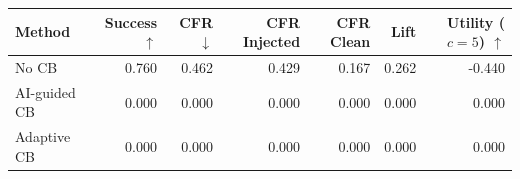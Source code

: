 \begin{tabular}{lrrrrrr}
\toprule
Method & Success $\uparrow$ & CFR $\downarrow$ & CFR Injected & CFR Clean & Lift & Utility ($c=5$) $\uparrow$ \\
\midrule
No CB & 0.760 & 0.462 & 0.429 & 0.167 & 0.262 & -0.440 \\
AI-guided CB & 0.000 & 0.000 & 0.000 & 0.000 & 0.000 & 0.000 \\
Adaptive CB & 0.000 & 0.000 & 0.000 & 0.000 & 0.000 & 0.000 \\
\bottomrule
\end{tabular}
